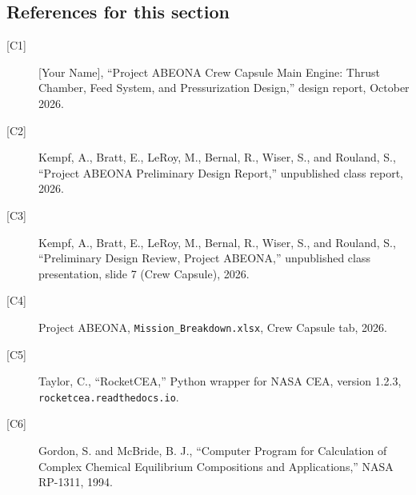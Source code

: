 \subsection*{References for this section}
{\small\begin{description}
\item[{[C1]}] [Your Name], ``Project ABEONA Crew Capsule Main Engine: Thrust Chamber, Feed System, and Pressurization Design,'' design report, October 2026.
\item[{[C2]}] Kempf, A., Bratt, E., LeRoy, M., Bernal, R., Wiser, S., and Rouland, S., ``Project ABEONA Preliminary Design Report,'' unpublished class report, 2026.
\item[{[C3]}] Kempf, A., Bratt, E., LeRoy, M., Bernal, R., Wiser, S., and Rouland, S., ``Preliminary Design Review, Project ABEONA,'' unpublished class presentation, slide 7 (Crew Capsule), 2026.
\item[{[C4]}] Project ABEONA, \texttt{Mission\_Breakdown.xlsx}, Crew Capsule tab, 2026.
\item[{[C5]}] Taylor, C., ``RocketCEA,'' Python wrapper for NASA CEA, version 1.2.3, \texttt{rocketcea.readthedocs.io}.
\item[{[C6]}] Gordon, S. and McBride, B. J., ``Computer Program for Calculation of Complex Chemical Equilibrium Compositions and Applications,'' NASA RP-1311, 1994.
\end{description}}
